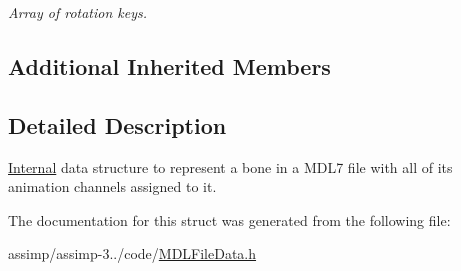 \begin{DoxyCompactItemize}
\begin{DoxyCompactList}\small\item\em Array of rotation keys. \end{DoxyCompactList}\end{DoxyCompactItemize}
\subsection*{Additional Inherited Members}


\subsection{Detailed Description}
\hyperlink{struct_internal}{Internal} data structure to represent a bone in a M\+D\+L7 file with all of its animation channels assigned to it. 

The documentation for this struct was generated from the following file\+:\begin{DoxyCompactItemize}
\item 
assimp/assimp-\/3../code/\hyperlink{_m_d_l_file_data_8h}{M\+D\+L\+File\+Data.\+h}\end{DoxyCompactItemize}
